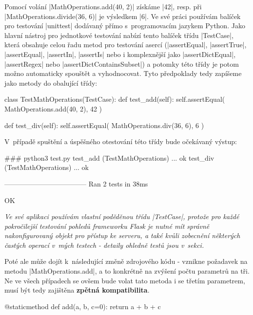 \begin{sloppypar}
	Pomocí volání \ic|MathOperations.add(40, 2)| získáme \ic|42|, resp. při \ic|MathOperations.divide(36, 6)| je výsledkem \ic|6|. Ve své práci používám balíček pro testování \ic|unittest| dodávaný přímo s~programovacím jazykem Python. Jako hlavní nástroj pro jednotkové testování nabízí tento balíček třídu \ic|TestCase|, která obsahuje celou řadu metod pro testování asercí (\ic|assertEqual|, \ic|assertTrue|, \ic|assertEqual|, \ic|assertIn|, \ic|assertIs| nebo i komplexnější jako \ic|assertDictEqual|, \ic|assertRegex| nebo \ic|assertDictContainsSubset|) a potomky této třídy je potom možno automaticky spouštět a vyhodnocovat. Tyto předpoklady tedy zapíšeme jako metody do obalující třídy:
\end{sloppypar}

\begin{code}[caption={Základní TestCase pro třídu $MathOperations$}]
class TestMathOperations(TestCase):
	def test_add(self):
		self.assertEqual(
			MathOperations.add(40, 2),
			42
		)

	def test_div(self):
		self.assertEqual(
			MathOperations.div(36, 6),
			6
		)
\end{code}

V~případě spuštění a úspěšného otestování této třídy bude očekávaný výstup:

\begin{code}[language=sh,caption={Ukázka výstupu ze spuštění testů}]
###\mbox{\textdollar} python3 test.py
test_add (TestMathOperations) ... ok
test_div (TestMathOperations) ... ok

------------------------------------
Ran 2 tests in 38ms

OK
\end{code}


{\itshape
	Ve své aplikaci používám vlastní poděděnou třídu \ic|TestCase|, protože pro každé pokročilejší testování pohledů frameworku Flask je nutné mít správně nakonfigurovaný objekt pro  přístup ke serveru, a také kvůli zobecnění některých častých operací v~mých testech - detaily ohledně testů jsou v~sekci.
}


Poté ale může dojít k~následující změně zdrojového k\'{o}du - vznikne požadavek na metodu \ic|MathOperations.add|, a to konkrétně na zvýšení počtu parametrů na tři. Ne ve všech případech se ovšem bude volat tato metoda i se třetím parametrem, musí být tedy zajištěna \textbf{zpětná kompatibilita}.

\begin{code}[caption={Vylepšená implementace metoda $MathOperations.add$}]
@staticmethod
def add(a, b, c=0):
	return a + b + c
\end{code}


